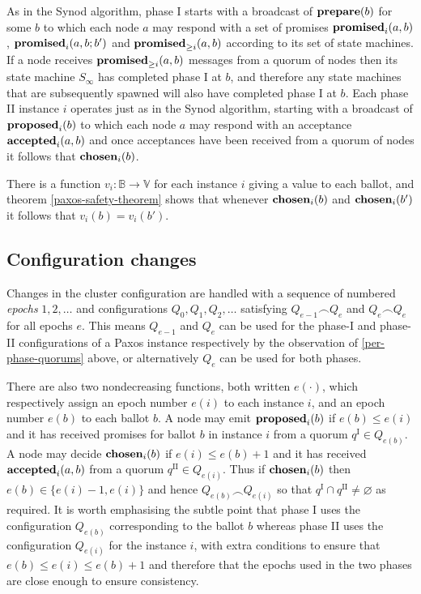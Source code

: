 \documentclass[journal]{IEEEtran}
\begin{document}
As in the Synod algorithm, phase I starts with a broadcast of $\mathbf{prepare}(b)$ for
some $b$ to which each node $a$ may respond with a set of promises
$\mathbf{promised}_{i}(a,b)$, $\mathbf{promised}_{i}(a,b;b')$ and $\mathbf{promised}_{\ge i}(a,b)$ according to its
set of state machines. If a node receives $\mathbf{promised}_{\ge i}(a,b)$ messages from a
quorum of nodes then its state machine $S_\infty$ has completed phase I at $b$,
and therefore any state machines that are subsequently spawned will also have
completed phase I at $b$. Each phase II instance $i$ operates just as in the
Synod algorithm, starting with a broadcast of $\mathbf{proposed}_{i}(b)$ to which each node
$a$ may respond with an acceptance $\mathbf{accepted}_{i}(a,b)$ and once acceptances have
been received from a quorum of nodes it follows that $\mathbf{chosen}_{i}(b)$.

There is a function $v_i : \mathbb B \to \mathbb V$ for each instance $i$
giving a value to each ballot, and theorem \ref{paxos-safety-theorem} shows
that whenever $\mathbf{chosen}_{i}(b)$ and $\mathbf{chosen}_{i}(b')$ it follows that $v_i(b) =
v_i(b')$.

\subsection{Configuration changes}\label{configuration-changes}

Changes in the cluster configuration are handled with a sequence of numbered
\textit{epochs} $1, 2, \ldots$ and configurations $Q_0, Q_1, Q_2, \ldots$
satisfying $Q_{e-1} \frown Q_e$ and $Q_e \frown Q_e$ for all epochs $e$.  This
means $Q_{e-1}$ and $Q_e$ can be used for the phase-I and phase-II
configurations of a Paxos instance respectively by the observation of
\ref{per-phase-quorums} above, or alternatively $Q_e$ can be used for both
phases.

There are also two nondecreasing functions, both written $e(\cdot)$, which
respectively assign an epoch number $e(i)$ to each instance $i$, and an epoch
number $e(b)$ to each ballot $b$. A node may emit $\mathbf{proposed}_{i}(b)$ if $e(b) \le
e(i)$ and it has received promises for ballot $b$ in instance $i$ from a
quorum $q^\textrm{I} \in Q_{e(b)}$. A node may decide $\mathbf{chosen}_{i}(b)$ if ${e(i)
\le e(b)+1}$ and it has received $\mathbf{accepted}_{i}(a,b)$ from a quorum ${q^\textrm{II}
\in Q_{e(i)}}$. Thus if $\mathbf{chosen}_{i}(b)$ then ${e(b) \in \{ e(i)-1, e(i) \}}$
and hence $Q_{e(b)} \frown Q_{e(i)}$ so that $q^\textrm{I} \cap q^\textrm{II}
\ne \varnothing$ as required. It is worth emphasising the subtle point that
phase I uses the configuration $Q_{e(b)}$ corresponding to the ballot $b$
whereas phase II uses the configuration $Q_{e(i)}$ for the instance $i$, with
extra conditions to ensure that $e(b) \le e(i) \le e(b) + 1$ and therefore that
the epochs used in the two phases are close enough to ensure consistency.
\end{document}

